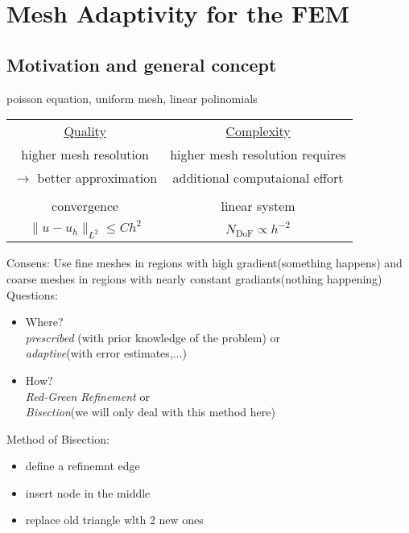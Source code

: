\section{Mesh Adaptivity for the FEM}
\subsection{Motivation and general concept}

\begin{example}
	poisson equation, uniform mesh, linear polinomials
\end{example}
\begin{center}
	\begin{tabular}{c | c}
		\underline{Quality} & \underline{Complexity}\\
		higher mesh resolution & higher mesh resolution requires \\
		$\to$ better approximation & additional computaional effort\\
		&  \\
		convergence & linear system \\
		$\|u-u_h\|_{L^2} \leq C h^2$ & $N_{\text{DoF}}\propto h^{-2}$
	\end{tabular}
\end{center}

Consens: Use fine meshes in regions with high gradient(something happens) and coarse meshes in regions with nearly constant gradiants(nothing happening)\\

Questions:
\begin{itemize}
	\item Where?\\
		\textit{prescribed} (with prior knowledge of the problem) or \\
		\textit{adaptive}(with error estimates,...)
	\item How?\\
		\textit{Red-Green Refinement} or \\
		\textit{Bisection}(we will only deal with this method here)
\end{itemize}

Method of Bisection:
\begin{itemize}
	\item define a refinemnt edge
	\item insert node in the middle
	\item replace old triangle wlth 2 new ones 
\end{itemize}


